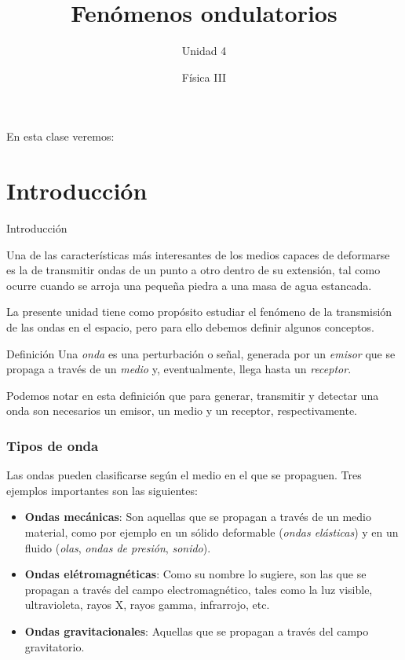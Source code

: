 \documentclass[11pt,handout,aspectratio=1610]{beamer}
\title{Fenómenos ondulatorios}
\subtitle{Unidad 4}
\author{Física III}
\institute{Instituto de Tecnología e Ingeniería \\ \vspace{0.25cm} Universidad Nacional de Hurlingham}
\date{ }
\newcommand{\vs}{\vspace{11pt}}
\begin{document}
\frame{\titlepage}

\begin{frame}{En esta clase veremos:}
    \tableofcontents
\end{frame}

\section{Introducción}

\begin{frame}{Introducción}

    Una de las características más interesantes de los medios capaces de deformarse es la de transmitir ondas de un punto a otro dentro de su extensión, tal como ocurre cuando se arroja una pequeña piedra a una masa de agua estancada.

    \vs

    La presente unidad tiene como propósito estudiar el fenómeno de la transmisión de las ondas en el espacio, pero para ello debemos definir algunos conceptos.

    \begin{block}{Definición}
        Una \emph{onda} es una perturbación o señal, generada por un \emph{emisor} que se propaga a través de un \emph{medio} y, eventualmente, llega hasta un \emph{receptor}.  
    \end{block}

    Podemos notar en esta definición que para generar, transmitir y detectar una onda son necesarios un emisor, un medio y un receptor, respectivamente.

\end{frame}

\begin{frame}
    \frametitle{Tipos de onda}

    Las ondas pueden clasificarse según el medio en el que se propaguen. Tres ejemplos importantes son las siguientes:
    \begin{itemize}
        \item \textbf{Ondas mecánicas}: Son aquellas que se propagan a través de un medio material, como por ejemplo en un sólido deformable (\emph{ondas elásticas}) y en un fluido (\emph{olas}, \emph{ondas de presión}, \emph{sonido}).
        \item \textbf{Ondas elétromagnéticas}: Como su nombre lo sugiere, son las que se propagan a través del campo electromagnético, tales como la luz visible, ultravioleta, rayos X, rayos gamma, infrarrojo, etc.
        \item \textbf{Ondas gravitacionales}: Aquellas que se propagan a través del campo gravitatorio.
    \end{itemize}

\end{frame}
\end{document}
